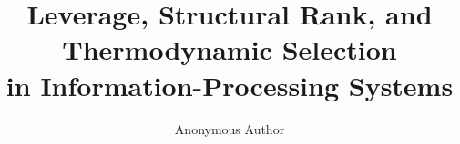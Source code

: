 \documentclass[acmtoplas,screen,review,anonymous]{acmart}
\theoremstyle{leanplain}
\theoremstyle{leandef}
\theoremstyle{leanremark}
\begin{document}
\title{Leverage, Structural Rank, and Thermodynamic Selection\\in Information-Processing Systems}

\author{Anonymous Author}


\end{document}
